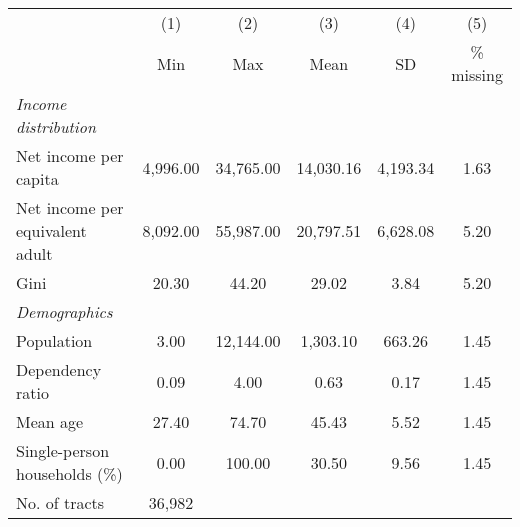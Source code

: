 
\begin{tabular}{@{}lccccc@{}}
\toprule
  & (1) & (2) & (3) &  (4) &  (5) \\
 & Min & Max & Mean & SD & \% missing\\
\midrule
\qquad \textit{Income distribution} \\
Net income per capita &  4,996.00 & 34,765.00 & 14,030.16 &  4,193.34 &      1.63\\
Net income per equivalent adult &  8,092.00 & 55,987.00 & 20,797.51 &  6,628.08 &      5.20\\
Gini &     20.30 &     44.20 &     29.02 &      3.84 &      5.20\\
\qquad \textit{Demographics} \\
Population &      3.00 & 12,144.00 &  1,303.10 &    663.26 &      1.45\\
Dependency ratio &      0.09 &      4.00 &      0.63 &      0.17 &      1.45\\
Mean age &     27.40 &     74.70 &     45.43 &      5.52 &      1.45\\
Single-person households (\%) &      0.00 &    100.00 &     30.50 &      9.56 &      1.45\\
\midrule
No. of tracts &          36,982 \\
\midrule
\end{tabular}